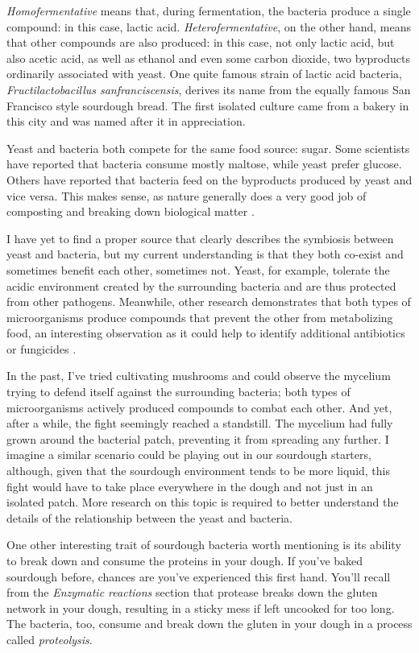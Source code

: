 \emph{Homofermentative} means that, during fermentation, the bacteria produce
a single compound: in this case, lactic acid. \emph{Heterofermentative}, on
the other hand, means that other compounds are also produced: in this case,
not only lactic acid, but also acetic acid, as well as ethanol and even some
carbon dioxide, two byproducts ordinarily associated with yeast. One quite
famous strain of lactic acid bacteria, \emph{Fructilactobacillus sanfranciscensis},
derives its name from the equally famous San Francisco style sourdough bread.
The first isolated culture came from a bakery in this city and was named after
it in appreciation.

Yeast and bacteria both compete for the same food source: sugar. Some scientists
have reported that bacteria consume mostly maltose, while yeast prefer glucose.
Others have reported that bacteria feed on the byproducts produced by yeast and
vice versa. This makes sense, as nature generally does a very good job of
composting and breaking down biological matter \cite{lactobacillus+sanfrancisco}.

I have yet to find a proper source that clearly describes the symbiosis between
yeast and bacteria, but my current understanding is that they both co-exist and
sometimes benefit each other, sometimes not. Yeast, for example, tolerate the
acidic environment created by the surrounding bacteria and are thus protected
from other pathogens. Meanwhile, other research demonstrates that both types of
microorganisms produce compounds that prevent the other from metabolizing food,
an interesting observation as it could help to identify additional antibiotics
or fungicides \cite{mold+lactic+acid+bacteria}.

In the past, I've tried cultivating mushrooms and could observe the mycelium
trying to defend itself against the surrounding bacteria; both types of
microorganisms actively produced compounds to combat each other. And yet,
after a while, the fight seemingly reached a standstill. The mycelium had fully
grown around the bacterial patch, preventing it from spreading any further. I
imagine a similar scenario could be playing out in our sourdough starters,
although, given that the sourdough environment tends to be more liquid, this
fight would have to take place everywhere in the dough and not just in an
isolated patch. More research on this topic is required to better understand
the details of the relationship between the yeast and bacteria.

One other interesting trait of sourdough bacteria worth mentioning is its
ability to break down and consume the proteins in your dough. If you've baked
sourdough before, chances are you've experienced this first hand. You'll recall
from the \emph{Enzymatic reactions} section that protease breaks down the
gluten network in your dough, resulting in a sticky mess if left uncooked
for too long. The bacteria, too, consume and break down the gluten in your
dough in a process called \emph{proteolysis}.

